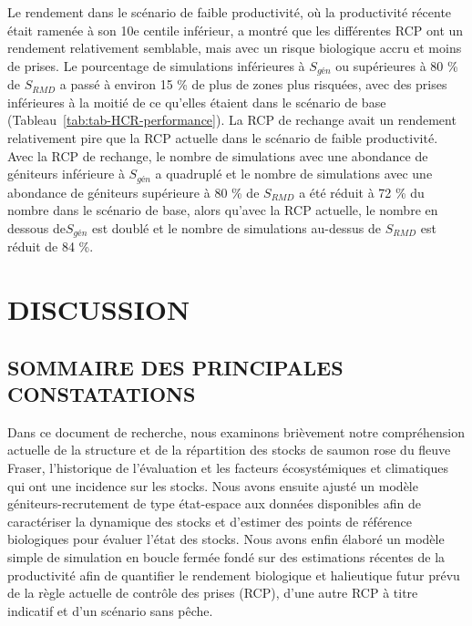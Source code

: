 \documentclass[french,11pt]{book}
\begin{document}
Le rendement dans le scénario de faible productivité, où la productivité récente était ramenée à son 10e centile inférieur, a montré que les différentes RCP ont un rendement relativement semblable, mais avec un risque biologique accru et moins de prises. Le pourcentage de simulations inférieures à \(S_{gén}\) ou supérieures à 80 \% de \(S_{RMD}\) a passé à environ 15 \% de plus de zones plus risquées, avec des prises inférieures à la moitié de ce qu'elles étaient dans le scénario de base (Tableau~\ref{tab:tab-HCR-performance}). La RCP de rechange avait un rendement relativement pire que la RCP actuelle dans le scénario de faible productivité. Avec la RCP de rechange, le nombre de simulations avec une abondance de géniteurs inférieure à \(S_{gén}\) a quadruplé et le nombre de simulations avec une abondance de géniteurs supérieure à 80 \% de \(S_{RMD}\) a été réduit à 72 \% du nombre dans le scénario de base, alors qu'avec la RCP actuelle, le nombre en dessous de\(S_{gén}\) est doublé et le nombre de simulations au-dessus de \(S_{RMD}\) est réduit de 84 \%.

\hypertarget{discussion}{%
\section{DISCUSSION}\label{discussion}}

\hypertarget{sommaire-des-principales-constatations}{%
\subsection{SOMMAIRE DES PRINCIPALES CONSTATATIONS}\label{sommaire-des-principales-constatations}}

Dans ce document de recherche, nous examinons brièvement notre compréhension actuelle de la structure et de la répartition des stocks de saumon rose du fleuve Fraser, l'historique de l'évaluation et les facteurs écosystémiques et climatiques qui ont une incidence sur les stocks. Nous avons ensuite ajusté un modèle géniteurs-recrutement de type état-espace aux données disponibles afin de caractériser la dynamique des stocks et d'estimer des points de référence biologiques pour évaluer l'état des stocks. Nous avons enfin élaboré un modèle simple de simulation en boucle fermée fondé sur des estimations récentes de la productivité afin de quantifier le rendement biologique et halieutique futur prévu de la règle actuelle de contrôle des prises (RCP), d'une autre RCP à titre indicatif et d'un scénario sans pêche.
\end{document}
